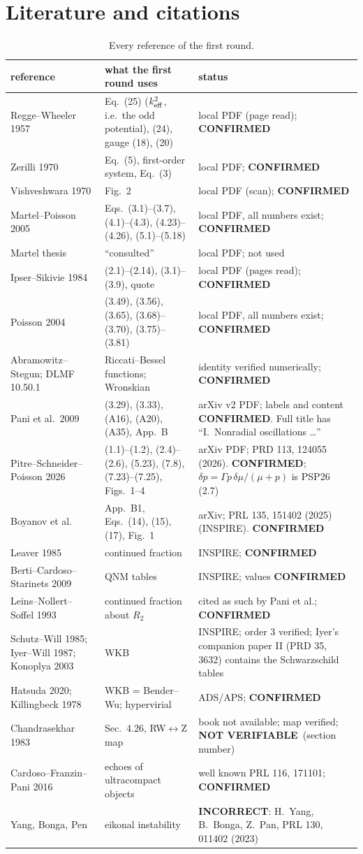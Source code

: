 \documentclass[11pt,a4paper]{article}
\newcommand{\OK}{\textcolor{green!50!black}{\textbf{CONFIRMED}}}
\newcommand{\NO}{\textcolor{red!75!black}{\textbf{INCORRECT}}}
\newcommand{\NV}{\textcolor{gray!80!black}{\textbf{NOT VERIFIABLE}}}
\begin{document}
\section{Literature and citations}\label{sec:lit}
\begin{longtable}{p{3.2cm}p{7.6cm}p{4.3cm}}
\caption{Every reference of the first round.}\label{tab:lit}\\\toprule
reference & what the first round uses & status\\\midrule\endhead
Regge--Wheeler 1957 & Eq.~(25) ($k_{\rm eff}^2$, i.e.\ the odd potential), (24), gauge (18), (20) & local PDF (page read); \OK\\
Zerilli 1970 & Eq.~(5), first-order system, Eq.~(3) & local PDF; \OK\\
Vishveshwara 1970 & Fig.~2 & local PDF (scan); \OK\\
Martel--Poisson 2005 & Eqs.~(3.1)--(3.7), (4.1)--(4.3), (4.23)--(4.26), (5.1)--(5.18) & local PDF, all numbers exist; \OK\\
Martel thesis & ``consulted'' & local PDF; not used\\
Ipser--Sikivie 1984 & (2.1)--(2.14), (3.1)--(3.9), quote & local PDF (pages read); \OK\\
Poisson 2004 & (3.49), (3.56), (3.65), (3.68)--(3.70), (3.75)--(3.81) & local PDF, all numbers exist; \OK\\
Abramowitz--Stegun; DLMF 10.50.1 & Riccati--Bessel functions; Wronskian & identity verified numerically; \OK\\
Pani et al.\ 2009 & (3.29), (3.33), (A16), (A20), (A35), App.~B & arXiv v2 PDF; labels and content \OK. Full title has
``I.\ Nonradial oscillations \dots''\\
Pitre--Schneider--Poisson 2026 & (1.1)--(1.2), (2.4)--(2.6), (5.23), (7.8), (7.23)--(7.25), Figs.~1--4 & arXiv PDF;
PRD 113, 124055 (2026). \OK; $\delta p=\Gamma p\,\delta\mu/(\mu+p)$ is PSP26 (2.7)\\
Boyanov et al. & App.~B1, Eqs.~(14), (15), (17), Fig.~1 & arXiv; PRL 135, 151402 (2025) (INSPIRE). \OK\\
Leaver 1985 & continued fraction & INSPIRE; \OK\\
Berti--Cardoso--Starinets 2009 & QNM tables & INSPIRE; values \OK\\
Leins--Nollert--Soffel 1993 & continued fraction about $R_2$ & cited as such by Pani et al.; \OK\\
Schutz--Will 1985; Iyer--Will 1987; Konoplya 2003 & WKB & INSPIRE; order 3 verified; Iyer's companion paper II (PRD 35, 3632) contains
the Schwarzschild tables\\
Hatsuda 2020; Killingbeck 1978 & WKB = Bender--Wu; hypervirial & ADS/APS; \OK\\
Chandrasekhar 1983 & Sec.~4.26, RW$\leftrightarrow$Z map & book not available; map verified; \NV\ (section number)\\
Cardoso--Franzin--Pani 2016 & echoes of ultracompact objects & well known PRL 116, 171101; \OK\\
Yang, Bonga, Pen & eikonal instability & \NO: H.~Yang, B.~Bonga, Z.~Pan, PRL 130, 011402 (2023)\\\bottomrule
\end{longtable}
\end{document}
